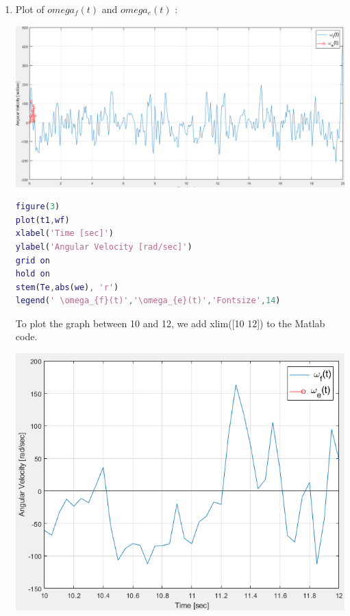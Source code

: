 \documentclass[a4paper,12pt]{article}
\begin{document}
\begin{enumerate}[label={\color{blue}\arabic*)}]
    \item
    Plot of \(omega_f(t)\) and \(omega_e(t)\) :
    \begin{multicols}{2}
        \begin{flushleft}
            \includegraphics[width=0.95\linewidth]{Images/Wf_and_We.png}
            \label{Figure7}
        \end{flushleft}

        \columnbreak

        \begin{lstlisting}[style=Matlab-editor,language=Matlab, basicstyle=\small\ttfamily]
figure(3)
plot(t1,wf)
xlabel('Time [sec]')
ylabel('Angular Velocity [rad/sec]')
grid on
hold on
stem(Te,abs(we), 'r')
legend(' \omega_{f}(t)','\omega_{e}(t)','Fontsize',14)
        \end{lstlisting}
    \end{multicols}

    \newpage

    To plot the graph between 10 and 12, we add xlim([10 12]) to the Matlab code.
    \begin{multicols}{2}
        \begin{flushleft}
            \includegraphics[width=0.75\linewidth]{Images/Wf_and_We_Zoomed.png}
            \label{Figure8}
        \end{flushleft}


\end{multicols}
\end{enumerate}
\end{document}
